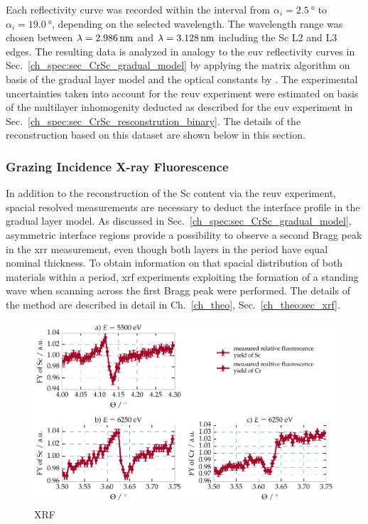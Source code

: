 Each reflectivity curve was recorded within the interval from $\alpha_i = \SI{2.5}{\degree}$ to $\alpha_i = \SI{19.0}{\degree}$, depending on the selected wavelength. The wavelength range was chosen between $\lambda = \nm{2.986}$ and $\lambda = \nm{3.128}$ including the Sc L2 and L3 edges. The resulting data is analyzed in analogy to the \gls{euv} reflectivity curves in Sec.~\ref{ch_spec:sec_CrSc_gradual_model} by applying the matrix algorithm on basis of the gradual layer model and the optical constants by \textcite{aquila_measurements_2004}. The experimental uncertainties taken into account for the \gls{reuv} experiment were estimated on basis of the multilayer inhomogenity deducted as described for the \gls{euv} experiment in Sec.~\ref{ch_spec:sec_CrSc_resconstrution_binary}. The details of the reconstruction based on this dataset are shown below in this section.

\subsubsection{Grazing Incidence X-ray Fluorescence}
In addition to the reconstruction of the Sc content via the \gls{reuv} experiment, spacial resolved measurements are necessary to deduct the interface profile in the gradual layer model. As discussed in Sec.~\ref{ch_spec:sec_CrSc_gradual_model}, asymmetric interface regions provide a possibility to observe a second Bragg peak in the \gls{xrr} measurement, even though both layers in the period have equal nominal thickness. To obtain information on that spacial distribution of both materials within a period, \gls{xrf} experiments exploiting the formation of a standing wave when scanning across the first Bragg peak were performed. The details of the method are described in detail in Ch.~\ref{ch_theo}, Sec.~\ref{ch_theo:sec_xrf}.

\begin{figure}[htbp]
  \centering
  \includegraphics[width=\textwidth]{img/CrSc_fluorescence_data}
  \caption{XRF}
  \label{ch_spec:fig_CrSc_fluorescence_data}
\end{figure}



